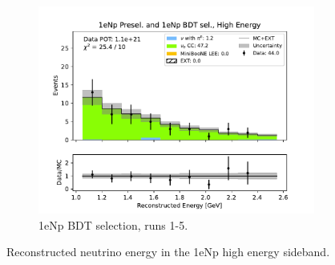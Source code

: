 \begin{figure}[H]
\begin{subfigure}{0.33\linewidth}
    \includegraphics[width=\linewidth]{technote/Sidebands/Figures/FarSideband/far_sideband_reco_e_run1234b4c4d5_NP_NPBDT_HIGH_ENERGY.pdf}
    \caption{1eNp BDT selection, runs 1-5.}
    \end{subfigure}
    \caption{Reconstructed neutrino energy in the 1eNp high energy sideband.}
     \label{fig:HighEnergy1eNp_reco_e}
\end{figure}

